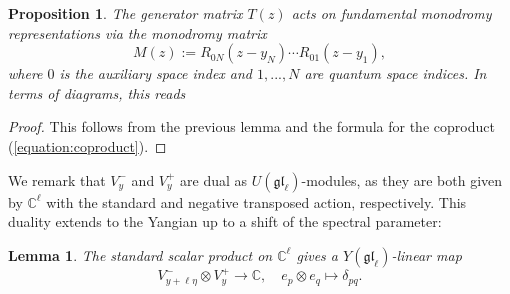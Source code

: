 \documentclass[11pt]{report}
\newtheorem{lemma}[theorem]{Lemma}
\newtheorem{prop}[theorem]{Proposition}
\theoremstyle{definition}
\theoremstyle{remark}
\theoremstyle{remark}
\newcommand{\C}{\mathbb{C}}
\begin{document}
\begin{prop}
The generator matrix $T(z)$ acts on fundamental monodromy representations via the \emph{monodromy matrix}
\begin{equation*}
M(z) := R_{0N}(z-y_N) \cdots R_{01}(z-y_1),
\end{equation*}
where $0$ is the auxiliary space index and $1,...,N$ are quantum space indices. In terms of diagrams, this reads
\begin{center}
\end{center}
\end{prop}

\begin{proof}
This follows from the previous lemma and the formula for the coproduct (\ref{equation:coproduct}).
\end{proof}

We remark that $V_y^-$ and $V_y^+$ are dual as $U(\mathfrak{gl}_\ell)$-modules, as they are both given by $\C^\ell$ with the standard and negative transposed action, respectively. This duality extends to the Yangian up to a shift of the spectral parameter:

\begin{lemma}
The standard scalar product on $\C^\ell$ gives a $Y(\mathfrak{gl}_\ell)$-linear map
\begin{equation*}
V_{y+\ell \eta}^- \otimes V_y^+ \to \C, \quad e_p \otimes e_q \mapsto \delta_{pq}.
\end{equation*}
\end{lemma}
\end{document}
